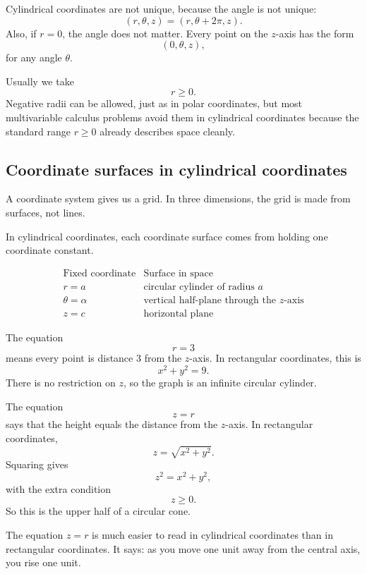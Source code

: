 Cylindrical coordinates are not unique, because the angle is not unique:
\[
    (r,\theta,z)=(r,\theta+2\pi,z).
\]
Also, if \(r=0\), the angle does not matter.  Every point on the \(z\)-axis has the form
\[
    (0,\theta,z),
\]
for any angle \(\theta\).

Usually we take
\[
    r\ge0.
\]
Negative radii can be allowed, just as in polar coordinates, but most multivariable
calculus problems avoid them in cylindrical coordinates because the standard range
\(r\ge0\) already describes space cleanly.

\subsection{Coordinate surfaces in cylindrical coordinates}

A coordinate system gives us a grid.  In three dimensions, the grid is made from
surfaces, not lines.

In cylindrical coordinates, each coordinate surface comes from holding one coordinate
constant.

\[
\begin{array}{c|c}
\text{Fixed coordinate} & \text{Surface in space} \\ \hline
r=a & \text{circular cylinder of radius }a\\[1mm]
\theta=\alpha & \text{vertical half-plane through the }z\text{-axis}\\[1mm]
z=c & \text{horizontal plane}
\end{array}
\]

\begin{example}
The equation
\[
    r=3
\]
means every point is distance \(3\) from the \(z\)-axis.  In rectangular coordinates,
this is
\[
    x^2+y^2=9.
\]
There is no restriction on \(z\), so the graph is an infinite circular cylinder.
\end{example}

\begin{example}
The equation
\[
    z=r
\]
says that the height equals the distance from the \(z\)-axis.  In rectangular coordinates,
\[
    z=\sqrt{x^2+y^2}.
\]
Squaring gives
\[
    z^2=x^2+y^2,
\]
with the extra condition
\[
    z\ge0.
\]
So this is the upper half of a circular cone.
\end{example}

The equation \(z=r\) is much easier to read in cylindrical coordinates than in rectangular
coordinates.  It says: as you move one unit away from the central axis, you rise one unit.

